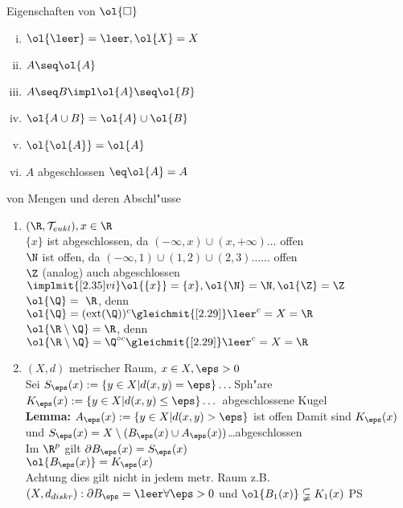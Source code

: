 \begin{prop}\label{2.35}{Eigenschaften von $\ol{\square}$}
\begin{enumerate}[(i)]
\item $\ol{\leer} =\leer , \ol{X}=X$
\item $A\seq \ol{A}$
\item $A\seq B \impl \ol{A}\seq \ol{B}$
\item $\ol{A\cup B}=\ol{A}\cup \ol{B}$
\item $\ol{\ol{A}}=\ol{A}$
\item $A$ abgeschlossen $\eq \ol{A}=A$
\end{enumerate}
\end{prop}

\begin{beispiel}\label{2.36}{von Mengen und deren Abschl"usse}
\begin{enumerate}
\item $(\R ,\T_{eukl}), x\in \R$\\
$\{ x\}$ ist abgeschlossen, da $(-\infty , x)\cup (x, +\infty)\dots$ offen\\
$\N$ ist offen, da $(-\infty , 1)\cup (1,2)\cup (2,3)\dots \dots$ offen\\
$\Z$ (analog) auch abgeschlossen\\
$\implmit{\ref{2.35}vi} \ol{\{ x\}}=\{ x\} , \ol{\N}=\N , \ol{\Z}=\Z$\\
$\ol{\Q}= \R$, denn $\ol{\Q} =(\ext{\Q})^c\gleichmit{\ref{2.29}} \leer^c =X=\R$\\
$\ol{\R\setminus \Q}=\R$, denn $\ol{\R\setminus\Q}=\Q^{\circ c}\gleichmit{\ref{2.29}}\leer^c=X=\R$
\item $(X,d)$ metrischer Raum, $x\in X,\eps >0$\\
Sei $S_\eps (x):=\{ y\in X|d(x,y)=\eps\}\dots$Sph"are\\
$K_\eps (x):=\{ y\in X|d(x,y)\leq\eps\}\dots$ abgeschlossene Kugel\\
{\bf Lemma:} $A_\eps (x):=\{ y\in X|d(x,y)>\eps\}$ ist offen
Damit sind $K_\eps (x)$ und $S_\eps (x) =X\setminus (B_\eps (x)\cup A_\eps (x))$\dots abgeschlossen\\
Im $\R^p$ gilt $\bd{B_\eps (x)}=S_\eps (x)$\\
\hspace*{2cm}$\ol{B_\eps (x)}=K_\eps (x)$\\
Achtung dies gilt nicht in jedem metr. Raum z.B. $(X,d_{diskr}):\\
\bd{B_\eps} =\leer \forall\eps >0$ und $\ol{B_1(x)}\subsetneqq K_1(x)$ PS
\end{enumerate}
\end{beispiel}

